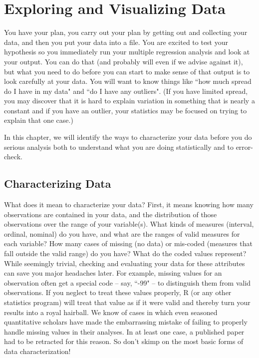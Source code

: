 \documentclass[11pt,openany]{book}
\begin{document}
\chapter{Exploring and Visualizing Data}



You have your plan, you carry out your plan by getting out and collecting your data, and then you put your data into a file.  You are excited to test your hypothesis so you immediately run your multiple regression analysis and look at your output.  You can do that (and probably will even if we advise against it), but what you need to do before you can start to make sense of that output is to look carefully at your data.  You will want to know things like ``how much spread do I have in my data" and ``do I have any outliers".  (If you have limited spread, you may discover that it is hard to explain variation in something that is nearly a constant and if you have an outlier, your statistics may be focused on trying to explain that one case.) 

In this chapter, we will identify the ways to characterize your data before you do serious analysis both to understand what you are doing statistically and to error-check.

\section{Characterizing Data}


What does it mean to characterize your data? First, it means knowing how many observations are contained in your data, and the distribution of those observations over the range of your variable(s). What kinds of measures (interval, ordinal, nominal) do you have, and what are the ranges of valid measures for each variable? How many cases of missing (no data) or mis-coded (measures that fall outside the valid range) do you have? What do the coded values represent? While seemingly trivial, checking and evaluating your data for these attributes can save you major headaches later. For example, missing values for an observation often get a special code -- say, ``-99" -- to distinguish them  from valid observations. If you neglect to treat these values properly, R (or any other statistics program) will treat that value as if it were valid and thereby turn your results into a royal hairball. We know of cases in which even seasoned quantitative scholars have made the embarrassing mistake of failing to properly handle missing values in their analyses. In at least one case, a published paper had to be retracted for this reason. So don't skimp on the most basic forms of data characterization!
\end{document}
